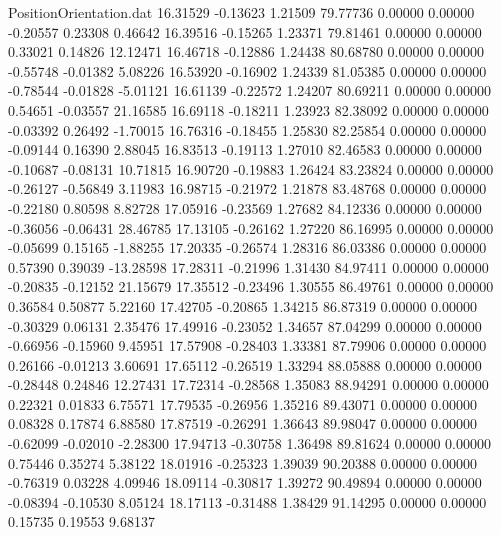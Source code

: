 \begin{filecontents}{PositionOrientation.dat}
  16.31529   -0.13623    1.21509    79.77736    0.00000    0.00000   -0.20557    0.23308    0.46642
  16.39516   -0.15265    1.23371    79.81461    0.00000    0.00000    0.33021    0.14826   12.12471
  16.46718   -0.12886    1.24438    80.68780    0.00000    0.00000   -0.55748   -0.01382    5.08226
  16.53920   -0.16902    1.24339    81.05385    0.00000    0.00000   -0.78544   -0.01828   -5.01121
  16.61139   -0.22572    1.24207    80.69211    0.00000    0.00000    0.54651   -0.03557   21.16585
  16.69118   -0.18211    1.23923    82.38092    0.00000    0.00000   -0.03392    0.26492   -1.70015
  16.76316   -0.18455    1.25830    82.25854    0.00000    0.00000   -0.09144    0.16390    2.88045
  16.83513   -0.19113    1.27010    82.46583    0.00000    0.00000   -0.10687   -0.08131   10.71815
  16.90720   -0.19883    1.26424    83.23824    0.00000    0.00000   -0.26127   -0.56849    3.11983
  16.98715   -0.21972    1.21878    83.48768    0.00000    0.00000   -0.22180    0.80598    8.82728
  17.05916   -0.23569    1.27682    84.12336    0.00000    0.00000   -0.36056   -0.06431   28.46785
  17.13105   -0.26162    1.27220    86.16995    0.00000    0.00000   -0.05699    0.15165   -1.88255
  17.20335   -0.26574    1.28316    86.03386    0.00000    0.00000    0.57390    0.39039  -13.28598
  17.28311   -0.21996    1.31430    84.97411    0.00000    0.00000   -0.20835   -0.12152   21.15679
  17.35512   -0.23496    1.30555    86.49761    0.00000    0.00000    0.36584    0.50877    5.22160
  17.42705   -0.20865    1.34215    86.87319    0.00000    0.00000   -0.30329    0.06131    2.35476
  17.49916   -0.23052    1.34657    87.04299    0.00000    0.00000   -0.66956   -0.15960    9.45951
  17.57908   -0.28403    1.33381    87.79906    0.00000    0.00000    0.26166   -0.01213    3.60691
  17.65112   -0.26519    1.33294    88.05888    0.00000    0.00000   -0.28448    0.24846   12.27431
  17.72314   -0.28568    1.35083    88.94291    0.00000    0.00000    0.22321    0.01833    6.75571
  17.79535   -0.26956    1.35216    89.43071    0.00000    0.00000    0.08328    0.17874    6.88580
  17.87519   -0.26291    1.36643    89.98047    0.00000    0.00000   -0.62099   -0.02010   -2.28300
  17.94713   -0.30758    1.36498    89.81624    0.00000    0.00000    0.75446    0.35274    5.38122
  18.01916   -0.25323    1.39039    90.20388    0.00000    0.00000   -0.76319    0.03228    4.09946
  18.09114   -0.30817    1.39272    90.49894    0.00000    0.00000   -0.08394   -0.10530    8.05124
  18.17113   -0.31488    1.38429    91.14295    0.00000    0.00000    0.15735    0.19553    9.68137

\end{filecontents}
